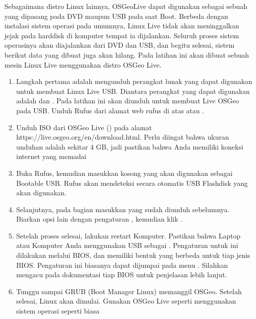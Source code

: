 \documentclass[letterpaper,10pt,english]{sphinxmanual}
\begin{document}
Sebagaimana distro Linux lainnya, OSGeoLive dapat digunakan sebagai sebuah  yang dipasang pada DVD maupun USB pada saat Boot. Berbeda dengan instalasi sistem operasi pada umumnya, Linux Live tidak akan meninggalkan jejak pada harddisk di komputer tempat ia dijalankan. Seluruh proses sistem operasinya akan diajalankan dari DVD dan USB, dan begitu selesai, sistem berikut data yang dibuat juga akan hilang. Pada latihan ini akan dibuat sebuah mesin Linux Live menggunakan distro OSGeo Live.
\begin{enumerate}
%
\item {} 
Langkah pertama adalah mengunduh perangkat lunak yang dapat digunakan untuk membuat Linux Live USB. Diantara perangkat yang dapat digunakan adalah  dan . Pada latihan ini akan diunduh  untuk membuat Live OSGeo pada USB. Unduh Rufus dari alamat web rufus di atas atau .

\item {} 
Unduh ISO dari OSGeo Live () pada alamat https://live.osgeo.org/en/download.html. Perlu diingat bahwa ukuran unduhan adalah sekitar 4 GB, jadi pastikan bahwa Anda memiliki koneksi internet yang memadai

\item {} 
Buka Rufus, kemudian masukkan  kosong yang akan digunakan sebagai Bootable USB. Rufus akan mendeteksi secara otomatis USB Flashdisk yang akan digunakan.

\item {} 
Selanjutnya, pada bagian  masukkan  yang sudah diunduh sebelumnya. Biarkan opsi lain dengan pengaturan , kemudian klik .


\item {} 
Setelah proses selesai, lakukan restart Komputer. Pastikan bahwa Laptop atau Komputer Anda menggunakan USB sebagai . Pengaturan untuk ini dilakukan melalui BIOS, dan memiliki bentuk yang berbeda untuk tiap jenis BIOS. Pengaturan ini biasanya dapat dijumpai pada menu . Silahkan mengacu pada dokumentasi tiap BIOS untuk penjelasan lebih lanjut.


\item {} 
Tunggu sampai GRUB (Boot Manager Linux) memanggil OSGeo. Setelah selesai, Linux akan dimulai. Gunakan OSGeo Live seperti menggunakan sistem operasi seperti biasa

\end{enumerate}
\end{document}
